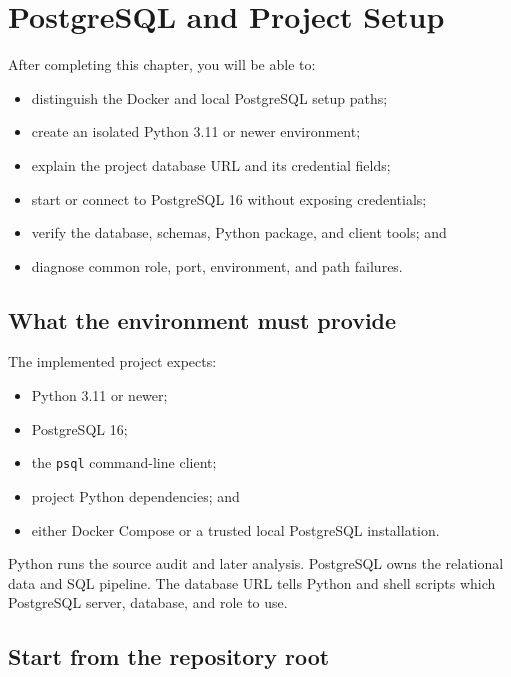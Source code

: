 \chapter{PostgreSQL and Project Setup}
\label{ch:postgresql-setup}

\begin{learningobjectives}
After completing this chapter, you will be able to:
\begin{itemize}
  \item distinguish the Docker and local PostgreSQL setup paths;
  \item create an isolated Python 3.11 or newer environment;
  \item explain the project database URL and its credential fields;
  \item start or connect to PostgreSQL 16 without exposing credentials;
  \item verify the database, schemas, Python package, and client tools; and
  \item diagnose common role, port, environment, and path failures.
\end{itemize}
\end{learningobjectives}

\section{What the environment must provide}

The implemented project expects:
\begin{itemize}
  \item Python 3.11 or newer;
  \item PostgreSQL 16;
  \item the \texttt{psql} command-line client;
  \item project Python dependencies; and
  \item either Docker Compose or a trusted local PostgreSQL installation.
\end{itemize}

\begin{plainlanguage}
Python runs the source audit and later analysis. PostgreSQL owns the relational
data and SQL pipeline. The database URL tells Python and shell scripts which
PostgreSQL server, database, and role to use.
\end{plainlanguage}

\section{Start from the repository root}

